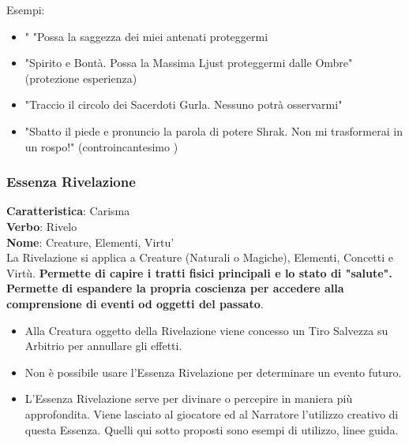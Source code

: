 \documentclass[a4paper,10 pt,twoside,openany]{book}
\begin{document}
\bigskip


Esempi:
\begin{itemize}
	\item "
	"Possa la saggezza dei miei antenati proteggermi
	\item
	"Spirito e Bontà. Possa la Massima Ljust proteggermi dalle Ombre" (protezione esperienza)
	\item
	"Traccio il circolo dei Sacerdoti Gurla. Nessuno potrà osservarmi"
	\item
	"Sbatto il piede e pronuncio la parola di potere Shrak. Non mi trasformerai in un rospo!" (controincantesimo )
\end{itemize}

\pagebreak

\subsubsection{Essenza Rivelazione}

\label{essenza-rivelazione---magnetismo}

\textbf{Caratteristica}: Carisma\\
\textbf{Verbo}: Rivelo\\
\textbf{Nome}: Creature, Elementi, Virtu'\\

La Rivelazione si applica a Creature (Naturali o Magiche), Elementi, Concetti e Virtù. \textbf{Permette di capire i tratti fisici principali e lo stato di "salute". Permette di espandere la propria coscienza per accedere alla comprensione di eventi od oggetti del passato}.
\begin{itemize}
	\item
	Alla Creatura oggetto della Rivelazione viene concesso un Tiro Salvezza
	su Arbitrio per annullare gli effetti.
	\item
	Non è possibile usare l'Essenza Rivelazione per determinare un evento futuro.
	\item
	L'Essenza Rivelazione serve per divinare o percepire in maniera più approfondita. Viene lasciato al giocatore ed al Narratore l'utilizzo creativo di questa Essenza. Quelli qui sotto proposti sono esempi di utilizzo, linee guida.
\end{itemize}

\bigskip
\end{document}
